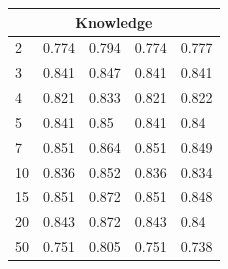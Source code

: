 \documentclass[12pt,a4paper]{article}
\begin{document}
\begin{tabular}{ |p{2.5cm}||p{2.5cm}|p{2.5cm}|p{2.5cm}|p{2.5cm}| }
\hline
\multicolumn{5}{|c|}{Knowledge}\\
\hline
2 & 0.774 & 0.794 & 0.774 & 0.777\\
3 & 0.841 & 0.847 & 0.841 & 0.841\\
4 & 0.821 & 0.833 & 0.821 & 0.822\\
5 & 0.841 & 0.85 & 0.841 & 0.84\\
7 & 0.851 & 0.864 & 0.851 & 0.849\\
10 & 0.836 & 0.852 & 0.836 & 0.834\\
15 & 0.851 & 0.872 & 0.851 & 0.848\\
20 & 0.843 & 0.872 & 0.843 & 0.84\\
50 & 0.751 & 0.805 & 0.751 & 0.738\\
\hline
\end{tabular}
\vspace{5cm}
\end{document}

